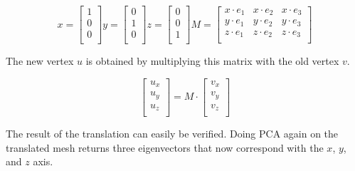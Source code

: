 \documentclass{bigdata}
\begin{document}
\[
x = 
\begin{bmatrix}
1 \\
0 \\
0 \\
\end{bmatrix}
y =
\begin{bmatrix}
0 \\
1 \\
0 \\
\end{bmatrix}
z =
\begin{bmatrix}
0 \\
0 \\
1 \\
\end{bmatrix}
M =
\begin{bmatrix}
x \cdot e_1 & x \cdot e_2 & x \cdot e_3 \\
y \cdot e_1 & y \cdot e_2 & y \cdot e_3 \\
z \cdot e_1 & z \cdot e_2 & z \cdot e_3 \\
\end{bmatrix}
\]

The new vertex $u$ is obtained by multiplying this matrix with the old vertex $v$.

\[
\begin{bmatrix}
u_x \\
u_y \\
u_z \\
\end{bmatrix}
=
M
\cdot
\begin{bmatrix}
v_x \\
v_y \\
v_z \\
\end{bmatrix}
\]

The result of the translation can easily be verified. Doing PCA again on the translated mesh returns three eigenvectors that now correspond with the $x$, $y$, and $z$ axis.
\end{document}
